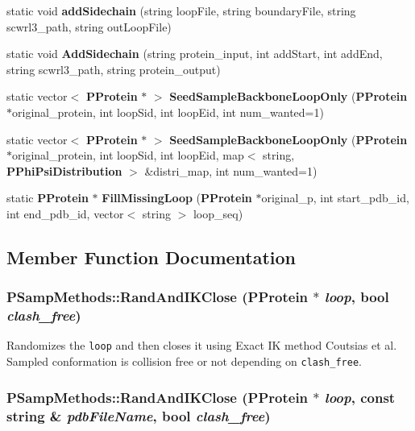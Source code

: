 \begin{CompactItemize}
\item 
static void {\bf add\-Sidechain} (string loop\-File, string boundary\-File, string scwrl3\_\-path, string out\-Loop\-File)
\item 
static void {\bf Add\-Sidechain} (string protein\_\-input, int add\-Start, int add\-End, string scwrl3\_\-path, string protein\_\-output)
\item 
static vector$<$ {\bf PProtein} $\ast$ $>$ {\bf Seed\-Sample\-Backbone\-Loop\-Only} ({\bf PProtein} $\ast$original\_\-protein, int loop\-Sid, int loop\-Eid, int num\_\-wanted=1)
\item 
static vector$<$ {\bf PProtein} $\ast$ $>$ {\bf Seed\-Sample\-Backbone\-Loop\-Only} ({\bf PProtein} $\ast$original\_\-protein, int loop\-Sid, int loop\-Eid, map$<$ string, {\bf PPhi\-Psi\-Distribution} $>$ \&distri\_\-map, int num\_\-wanted=1)
\item 
static {\bf PProtein} $\ast$ {\bf Fill\-Missing\-Loop} ({\bf PProtein} $\ast$original\_\-p, int start\_\-pdb\_\-id, int end\_\-pdb\_\-id, vector$<$ string $>$ loop\_\-seq)
\end{CompactItemize}


\subsection{Member Function Documentation}
\subsubsection{ PSamp\-Methods::Rand\-And\-IKClose ({\bf PProtein} $\ast$ {\em loop}, bool {\em clash\_\-free})\hspace{0.3cm}{\tt  [static]}}\label{classPSampMethods_1aab3b233f25a87c694a167bb3581e75}


Randomizes the {\tt loop} and then closes it using Exact IK method Coutsias et al. Sampled conformation is collision free or not depending on {\tt clash\_\-free}. 
\subsubsection{ PSamp\-Methods::Rand\-And\-IKClose ({\bf PProtein} $\ast$ {\em loop}, const string \& {\em pdb\-File\-Name}, bool {\em clash\_\-free})\hspace{0.3cm}{\tt  [static]}}\label{classPSampMethods_1f7d67a9865c713b8ef2b2fe5b1746f8}


